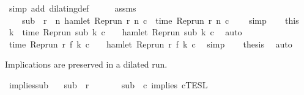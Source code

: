 \begin{isabellebody}
\ {\isacharparenleft}simp\ add{\isacharcolon}\ dilating{\isacharunderscore}def{\isacharparenright}\isanewline
\ \ \isamarkupfalse%
\ \isamarkupfalse%
\ assms{\isacharparenleft}{}{\isacharparenright}\ \isamarkupfalse%
\isanewline
\ \ \ \ {\isacartoucheopen}sub\ {\isasymin}\ {\isacharbraceleft}r{\isachardot}\ {\isasymexists}\ n{\isachardot}\ hamlet\ {\isacharparenleft}{\isacharparenleft}Rep{\isacharunderscore}run\ r{\isacharparenright}\ n\ c{\isacharparenright}\ {\isasymand}\ time\ {\isacharparenleft}{\isacharparenleft}Rep{\isacharunderscore}run\ r{\isacharparenright}\ n\ c{\isacharprime}{\isacharparenright}\ {\isacharequal}\ {\isasymtau}{\isacharbraceright}{\isacartoucheclose}\ \isamarkupfalse%
\ simp\isanewline
\ \ \isamarkupfalse%
\ this\ \isamarkupfalse%
\ k\ \ {\isacartoucheopen}time\ {\isacharparenleft}{\isacharparenleft}Rep{\isacharunderscore}run\ sub{\isacharparenright}\ k\ c{\isacharprime}{\isacharparenright}\ {\isacharequal}\ {\isasymtau}\ {\isasymand}\ hamlet\ {\isacharparenleft}{\isacharparenleft}Rep{\isacharunderscore}run\ sub{\isacharparenright}\ k\ c{\isacharparenright}{\isacartoucheclose}\ \isamarkupfalse%
\ auto\isanewline
\ \ \isamarkupfalse%
\ \isamarkupfalse%
\ {\isacartoucheopen}time\ {\isacharparenleft}{\isacharparenleft}Rep{\isacharunderscore}run\ r{\isacharparenright}\ {\isacharparenleft}f\ k{\isacharparenright}\ c{\isacharprime}{\isacharparenright}\ {\isacharequal}\ {\isasymtau}\ {\isasymand}\ hamlet\ {\isacharparenleft}{\isacharparenleft}Rep{\isacharunderscore}run\ r{\isacharparenright}\ {\isacharparenleft}f\ k{\isacharparenright}\ c{\isacharparenright}{\isacartoucheclose}\ \isamarkupfalse%
\ simp\isanewline
\ \ \isamarkupfalse%
\ {\isacharquery}thesis\ \isamarkupfalse%
\ auto\isanewline
{}\isamarkupfalse%
%
\endisatagproof
{\isafoldproof}%
%
\isadelimproof
%
\endisadelimproof
%
\begin{isamarkuptext}%
Implications are preserved in a dilated run.%
\end{isamarkuptext}\isamarkuptrue%
\isamarkupfalse%
\ implies{\isacharunderscore}sub{\isacharcolon}\isanewline
\ \ \ {\isacartoucheopen}sub\ {\isasymlless}\ r{\isacartoucheclose}\isanewline
\ \ \ \ \ \ \ {\isacartoucheopen}sub\ {\isasymin}\ {\isasymlbrakk}c\ implies\ c\isactrlsub T\isactrlsub E\isactrlsub S\isactrlsub L{\isacartoucheclose}\isanewline

\end{isabellebody}
